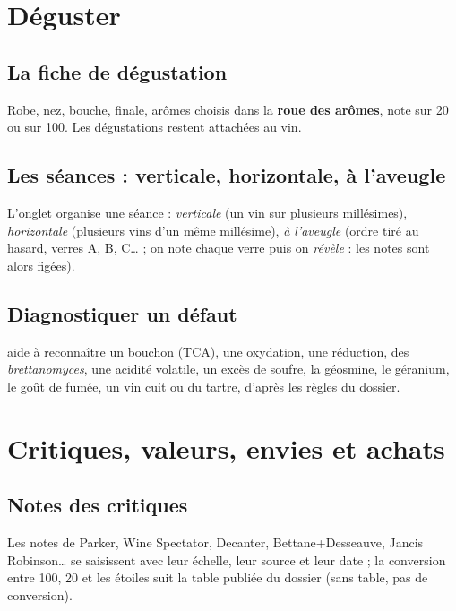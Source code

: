\documentclass[11pt,a4paper]{article}
\begin{document}

\section{Déguster}
\subsection{La fiche de dégustation}
Robe, nez, bouche, finale, arômes choisis dans la \textbf{roue des arômes}, note sur 20 ou sur 100. Les
dégustations restent attachées au vin.


\subsection{Les séances : verticale, horizontale, à l'aveugle}
L'onglet  organise une séance : \emph{verticale} (un vin sur plusieurs millésimes),
\emph{horizontale} (plusieurs vins d'un même millésime), \emph{à l'aveugle} (ordre tiré au hasard, verres A,
B, C… ; on note chaque verre puis on \emph{révèle} : les notes sont alors figées).


\subsection{Diagnostiquer un défaut}
 aide à reconnaître un bouchon (TCA), une oxydation,
une réduction, des \emph{brettanomyces}, une acidité volatile, un excès de soufre, la géosmine, le géranium,
le goût de fumée, un vin cuit ou du tartre, d'après les règles du dossier.


\section{Critiques, valeurs, envies et achats}
\subsection{Notes des critiques}
Les notes de Parker, Wine Spectator, Decanter, Bettane+Desseauve, Jancis Robinson… se saisissent avec leur
échelle, leur source et leur date ; la conversion entre 100, 20 et les étoiles suit la table publiée du
dossier (sans table, pas de conversion).
\end{document}
